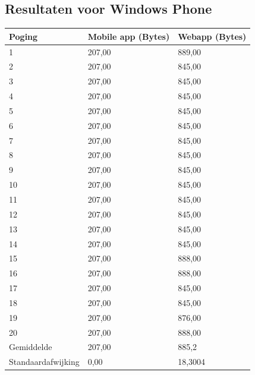\documentclass[pdftex,a4paper,12pt,twoside]{report}
\begin{document}
\subsection{Resultaten voor Windows Phone}
\begin{center}
  \begin{tabular}{ | l | l | l |}
      \hline
      Poging & Mobile app (Bytes) & Webapp (Bytes)
      \\ \hline
      1 & 207,00 & 889,00
      \\ \hline
      2 & 207,00 & 845,00
      \\ \hline
      3 & 207,00 & 845,00
      \\ \hline
      4 & 207,00 & 845,00
      \\ \hline
      5 & 207,00 & 845,00
      \\ \hline
      6 & 207,00 & 845,00
      \\ \hline
      7 & 207,00 & 845,00
      \\ \hline
      8 & 207,00 & 845,00
      \\ \hline
      9 & 207,00 & 845,00
      \\ \hline
      10 & 207,00 & 845,00
      \\ \hline
      11 & 207,00 & 845,00
      \\ \hline
      12 & 207,00 & 845,00
      \\ \hline
      13 & 207,00 & 845,00
      \\ \hline
      14 & 207,00 & 845,00
      \\ \hline
      15 & 207,00 & 888,00
      \\ \hline
      16 & 207,00 & 888,00
      \\ \hline
      17 & 207,00 & 845,00
      \\ \hline
      18 & 207,00 & 845,00
      \\ \hline
      19 & 207,00 & 876,00
      \\ \hline
      20 & 207,00 & 888,00
      \\ \hline
      Gemiddelde & 207,00 & 885,2
      \\ \hline
      Standaardafwijking & 0,00 & 18,3004
      \\ \hline
  \end{tabular}
\end{center}
\end{document}
